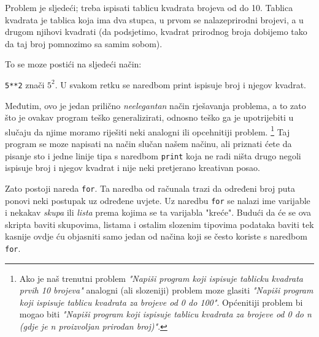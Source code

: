 Problem je sljedeći; treba ispisati tablicu kvadrata brojeva od do 10.
Tablica kvadrata je tablica koja ima dva stupca, u prvom se nalazeprirodni
brojevi, a u drugom njihovi kvadrati (da podsjetimo, kvadrat prirodnog
broja dobijemo tako da taj broj pomnozimo sa samim sobom).

To se moze postići na sljedeći način:


\verb"5**2" znači $5^2$. U svakom retku se naredbom print ispisuje broj i
njegov kvadrat. 

Međutim, ovo je jedan prilično \emph{neelegantan} način rješavanja
problema, a to zato što je ovakav program teško generalizirati,
odnosno teško ga je upotrijebiti u slučaju da njime moramo
riješiti neki analogni ili opcehnitiji problem. 
\footnote{
	Ako je naš trenutni
	problem \emph{"Napiši program koji ispisuje tablicku kvadrata
	prvih 10 brojeva"} analogni (ali slozeniji) problem moze glasiti
	\emph{"Napiši program koji ispisuje tablicu kvadrata za brojeve
	od 0 do 100"}. Općenitiji problem bi mogao biti \emph{"Napiši
	program koji ispisuje tablicu kvadrata za brojeve od 0 do n (gdje
	je n proizvoljan prirodan broj)"}. 
}
Taj program se moze napisati
na način slučan našem načinu, ali priznati ćete da pisanje
sto i jedne linije tipa s naredbom \verb"print" koja ne radi ništa
drugo negoli ispisuje broj i njegov kvadrat i nije neki pretjerano
kreativan posao.

Zato postoji nareda \verb"for". Ta naredba od računala trazi da
određeni broj puta ponovi neki postupak uz određene uvjete. Uz
naredbu \verb"for" se nalazi ime varijable i nekakav \emph{skupa}
ili \emph{lista} prema kojima se ta varijabla "kreće". Budući da
će se ova skripta baviti skupovima, listama i ostalim slozenim
tipovima podataka baviti tek kasnije ovdje ću objasniti samo jedan
od načina koji se često koriste s naredbom \verb"for".


